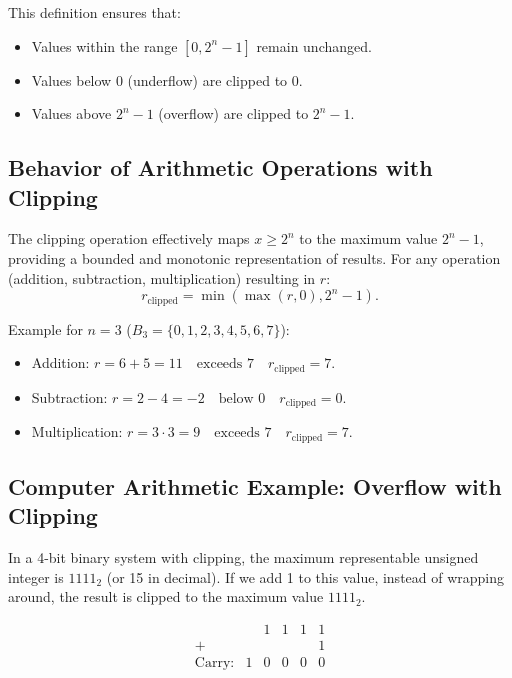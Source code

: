 This definition ensures that:
\begin{itemize}
    \item Values within the range \( [0, 2^n - 1] \) remain unchanged.
    \item Values below \( 0 \) (underflow) are clipped to \( 0 \).
    \item Values above \( 2^n - 1 \) (overflow) are clipped to \( 2^n - 1 \).
\end{itemize}

\subsection{Behavior of Arithmetic Operations with Clipping}
The clipping operation effectively maps \( x \geq 2^n \) to the maximum value \( 2^n - 1 \), providing a bounded and monotonic representation of results. For any operation (addition, subtraction, multiplication) resulting in \( r \):
\[
r_{\text{clipped}} = \min(\max(r, 0), 2^n - 1).
\]

Example for \( n = 3 \) (\( B_3 = \{0, 1, 2, 3, 4, 5, 6, 7\} \)):
\begin{itemize}
    \item Addition:
   \( r = 6 + 5 = 11 \quad \text{exceeds }  7  \quad r_{\text{clipped}} = 7 \).
    \item Subtraction:
   \( r = 2 - 4 = -2 \quad  \text{below } 0 \quad r_{\text{clipped}} = 0 \).
    \item Multiplication:
   \( r = 3 \cdot 3 = 9 \quad \text{exceeds } 7 \quad r_{\text{clipped}} = 7 \).
\end{itemize}



\subsection{Computer Arithmetic Example: Overflow with Clipping} \label{subsub:overflow_clipping_example}
In a 4-bit binary system with clipping, the maximum representable unsigned integer is \( 1111_2 \) (or 15 in decimal). If we add 1 to this value, instead of wrapping around, the result is clipped to the maximum value \( 1111_2 \).

\[
\begin{array}{rccccc}
       & & 1 & 1 & 1 & 1 \\ %
    +  & &   &   &   & 1 \\ %
    \hline
\text{Carry:} & 1 & 0 & 0 & 0 & 0 \\ %
\end{array}
\]

